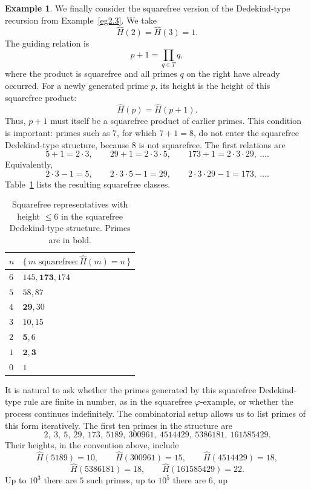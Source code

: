 \documentclass[11pt]{article}
\theoremstyle{definition}
\newtheorem{example}{Example}
\begin{document}
\begin{example}\label{eg:sf-dedekind}
We finally consider the squarefree version of the Dedekind-type recursion from
Example~\ref{eg2.3}.  We take
\[
  \widehat H(2)=\widehat H(3)=1.
\]
The guiding relation is
\[
  p+1=\prod_{q\in T}q,
\]
where the product is squarefree and all primes \(q\) on the right have already
occurred.  For a newly generated prime \(p\), its height is the height of this
squarefree product:
\[
  \widehat H(p)=\widehat H(p+1).
\]
Thus, \(p+1\) must itself be a squarefree product of earlier primes.  This
condition is important: primes such as \(7\), for which \(7+1=8\), do not enter
the squarefree Dedekind-type structure, because \(8\) is not squarefree.
The first relations are
\[
  5+1=2\cdot3,\qquad
  29+1=2\cdot3\cdot5,\qquad
  173+1=2\cdot3\cdot29,\ \ldots.
\]
Equivalently,
\[
  2\cdot3-1=5,\qquad
  2\cdot3\cdot5-1=29,\qquad
  2\cdot3\cdot29-1=173,\ \ldots.
\]
Table~\ref{tab:sf-dedekind} lists the resulting squarefree classes.
\begin{table}[ht]
\centering
\begin{tabular}{|l|l|}
\hline\hline
\(n\) & \(\{\,m\text{ squarefree}:\widehat H(m)=n\,\}\)\\
\hline
\(6\) & \(145, \mathbf{173}, 174\) \\
\(5\) & \(58, 87\) \\
\(4\) & \(\mathbf{29}, 30\) \\
\(3\) & \(10, 15\) \\
\(2\) & \(\mathbf{5}, 6\) \\
\(1\) & \(\mathbf{2}, \mathbf{3}\) \\
\(0\) & \(1\) \\
\hline
\end{tabular}
\caption{Squarefree representatives with height \(\le6\) in the squarefree
Dedekind-type structure.  Primes are in bold.}
\label{tab:sf-dedekind}
\end{table}
It is natural to ask whether the primes generated by this squarefree
Dedekind-type rule are finite in number, as in the squarefree
\(\varphi\)-example, or whether the process continues indefinitely.  The
combinatorial setup allows us to list primes of this form iteratively.  The
first ten primes in the structure are
\[
  2,\ 3,\ 5,\ 29,\ 173,\ 5189,\ 300961,\ 4514429,\ 5386181,\ 161585429.
\]
Their heights, in the convention above, include
\[
  \widehat H(5189)=10,\qquad
  \widehat H(300961)=15,\qquad
  \widehat H(4514429)=18,
\]
\[
  \widehat H(5386181)=18,\qquad
  \widehat H(161585429)=22.
\]
Up to \(10^3\) there are \(5\) such primes, up to \(10^5\) there are \(6\), up

\end{example}
\end{document}
